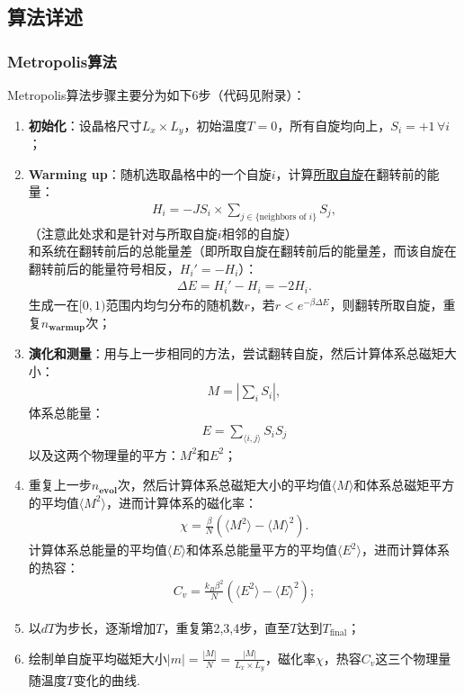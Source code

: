 \documentclass[UTF8,10pt,a4paper]{article}
\theoremstyle{Problem}
\theoremstyle{Solution}
\providecommand{\abs}[1]{\left\lvert#1\right\rvert}
\begin{document}
\subsection{算法详述}

\subsubsection{Metropolis算法}

Metropolis算法步骤主要分为如下6步（代码见附录）：
\begin{enumerate}
    \item \textbf{初始化}：设晶格尺寸$L_x\times L_y$，初始温度$T=0$，所有自旋均向上，$S_i=+1\,\forall i$；
    \item \textbf{Warming up}：随机选取晶格中的一个自旋$i$，计算\uline{所取自旋}在翻转前的能量：
    \begin{align}
        H_i=-JS_i\times\sum_{j\in\{\text{neighbors of }i\}}S_j,
    \end{align}
    （注意此处求和是针对与所取自旋$i$相邻的自旋）\\
    和系统在翻转前后的总能量差（即所取自旋在翻转前后的能量差，而该自旋在翻转前后的能量符号相反，$H_i'=-H_i$）：
    \begin{align}
        \Delta E=H_i'-H_i=-2H_i.
    \end{align}
    生成一在$[0,1)$范围内均匀分布的随机数$r$，若$r<e^{-\beta\Delta E}$，则翻转所取自旋，重复$n_{\textbf{warmup}}$次；
    \item \textbf{演化和测量}：用与上一步相同的方法，尝试翻转自旋，然后计算体系总磁矩大小：
    \begin{align}
        M=\abs{\sum_iS_i},
    \end{align}
    体系总能量：
    \begin{align}
        E=\sum_{\langle i,j\rangle}S_iS_j
    \end{align}
    以及这两个物理量的平方：$M^2$和$E^2$；
    \item 重复上一步$n_{\textbf{evol}}$次，然后计算体系总磁矩大小的平均值$\langle M\rangle$和体系总磁矩平方的平均值$\langle M^2\rangle$，进而计算体系的磁化率：
    \begin{align}
        \chi=\frac{\beta}{N}(\langle M^2\rangle-\langle M\rangle^2).
    \end{align}
    计算体系总能量的平均值$\langle E\rangle$和体系总能量平方的平均值$\langle E^2\rangle$，进而计算体系的热容：
    \begin{align}
        C_v=\frac{k_B\beta^2}{N}(\langle E^2\rangle-\langle E\rangle^2);
    \end{align}
    \item 以$dT$为步长，逐渐增加$T$，重复第2,3,4步，直至$T$达到$T_{\text{final}}$；
    \item 绘制单自旋平均磁矩大小$\abs{m}=\frac{\abs{M}}{N}=\frac{\abs{M}}{L_x\times L_y}$，磁化率$\chi$，热容$C_v$这三个物理量随温度$T$变化的曲线.
\end{enumerate}
\end{document}
